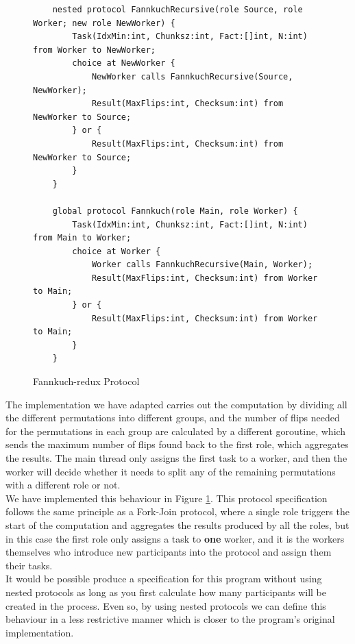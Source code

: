 \documentclass[12pt,twoside]{report}
\begin{document}
\begin{figure}[htb!]
    \centering
    \lstset{language=Scribble}
    \begin{lstlisting}
    nested protocol FannkuchRecursive(role Source, role Worker; new role NewWorker) {
        Task(IdxMin:int, Chunksz:int, Fact:[]int, N:int) from Worker to NewWorker;
        choice at NewWorker {
            NewWorker calls FannkuchRecursive(Source, NewWorker);
            Result(MaxFlips:int, Checksum:int) from NewWorker to Source;
        } or {
            Result(MaxFlips:int, Checksum:int) from NewWorker to Source;
        }
    }
    
    global protocol Fannkuch(role Main, role Worker) {
        Task(IdxMin:int, Chunksz:int, Fact:[]int, N:int) from Main to Worker;
        choice at Worker {
            Worker calls FannkuchRecursive(Main, Worker);
            Result(MaxFlips:int, Checksum:int) from Worker to Main;
        } or {
            Result(MaxFlips:int, Checksum:int) from Worker to Main;
        }
    }
    \end{lstlisting}
    \caption{Fannkuch-redux Protocol}
    \label{fannkuch-protocol}
\end{figure}

The implementation we have adapted carries out the computation by dividing all the different permutations into different groups, and the number of flips needed for the permutations in each group are calculated by a different goroutine, which sends the maximum number of flips found back to the first role, which aggregates the results. The main thread only assigns the first task to a worker, and then the worker will decide whether it needs to split any of the remaining permutations with a different role or not.\\

We have implemented this behaviour in Figure \ref{fannkuch-protocol}. This protocol specification follows the same principle as a Fork-Join protocol, where a single role triggers the start of the computation and aggregates the results produced by all the roles, but in this case the first role only assigns a task to \textbf{one} worker, and it is the workers themselves who introduce new participants into the protocol and assign them their tasks.\\

It would be possible produce a specification for this program without using nested protocols as long as you first calculate how many participants will be created in the process. Even so, by using nested protocols we can define this behaviour in a less restrictive manner which is closer to the program's original implementation.
\end{document}

